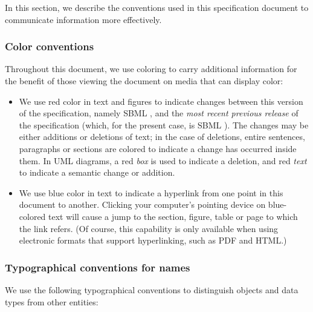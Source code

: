 In this section, we describe the conventions used in this
specification document to communicate information more
effectively.

\subsubsection{Color conventions}
\label{sec:notation-color}

Throughout this document, we use coloring to carry additional
information for the benefit of those viewing the document on media
that can display color:

\begin{itemize}

\item We use red color in text and figures to indicate changes
  between this version of the specification, namely SBML \thisLVR, and
  the \emph{most recent previous release} of the specification
  (which, for the present case, is SBML \thisLV \emph{}).  The changes may be either
  additions or deletions of text; in the case of deletions, entire
  sentences, paragraphs or sections are colored to indicate a
  change has occurred inside them.  In UML diagrams, a red \emph{box} is used to indicate a deletion, and red \emph{text} to indicate a semantic change or addition.

\item We use blue color in text to indicate a hyperlink from one
  point in this document to another.  Clicking your computer's
  pointing device on blue-colored text will cause a jump to the
  section, figure, table or page to which the link refers.  (Of
  course, this capability is only available when using electronic
  formats that support hyperlinking, such as PDF and
  HTML.)

\end{itemize}


\subsubsection{Typographical conventions for names}
\label{sec:notation-typographical}

We use the following typographical conventions to distinguish
objects and data types from other entities:

